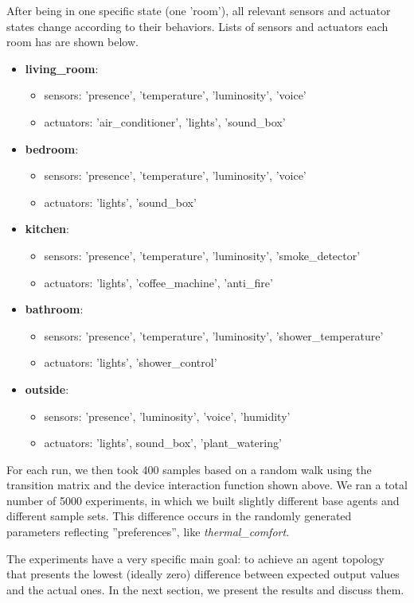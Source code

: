 After being in one specific state (one 'room'), all relevant sensors and actuator states change according to their behaviors. Lists of sensors and actuators each room has are shown below.
\begin{itemize}
    \item \textbf{living\_room}:
        \begin{itemize}
            \item sensors: 'presence', 'temperature', 'luminosity', 'voice'
            \item actuators: 'air\_conditioner', 'lights', 'sound\_box'
        \end{itemize}
    \item \textbf{bedroom}:
        \begin{itemize}
            \item sensors: 'presence', 'temperature', 'luminosity', 'voice'
            \item actuators: 'lights', 'sound\_box'
        \end{itemize}
    \item \textbf{kitchen}:
        \begin{itemize}
            \item sensors: 'presence', 'temperature', 'luminosity', 'smoke\_detector'
            \item actuators: 'lights', 'coffee\_machine', 'anti\_fire'
        \end{itemize}
    \item \textbf{bathroom}:
        \begin{itemize}
            \item sensors: 'presence', 'temperature', 'luminosity', 'shower\_temperature'
            \item actuators: 'lights', 'shower\_control'
        \end{itemize}
    \item \textbf{outside}:
        \begin{itemize}
            \item sensors: 'presence', 'luminosity', 'voice', 'humidity'
            \item actuators: 'lights', sound\_box', 'plant\_watering'
        \end{itemize}
\end{itemize}

For each run, we then took 400 samples based on a random walk using the transition matrix and the device interaction function shown above.
We ran a total number of 5000 experiments, in which we built slightly different base agents and different sample sets. This difference occurs in the randomly generated parameters reflecting ''preferences'', like \emph{thermal\_comfort}.



The experiments have a very specific main goal: to achieve an agent topology that presents the lowest (ideally zero) difference between expected output values and the actual ones. In the next section, we present the results and discuss them.
